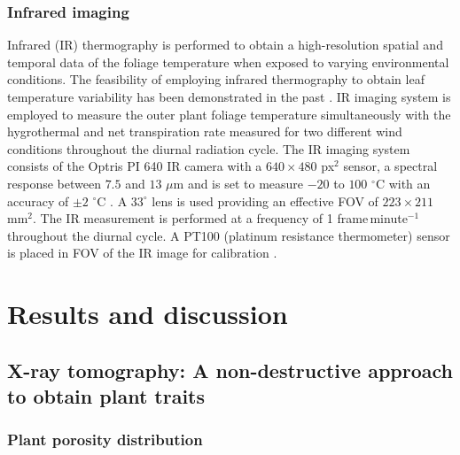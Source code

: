 \subsubsection*{Infrared imaging}
Infrared (IR) thermography is performed to obtain a high-resolution spatial and temporal data of the foliage temperature when exposed to varying environmental conditions. The feasibility of employing infrared thermography to obtain leaf temperature variability has been demonstrated in the past \citep{Jones1999,Merlot2002}. IR imaging system is employed to measure the outer plant foliage temperature simultaneously with the hygrothermal and net transpiration rate measured for two different wind conditions throughout the diurnal radiation cycle. The IR imaging system consists of the Optris PI 640 IR camera with a $640\times480$ px$^2$ sensor, a spectral response between $7.5$ and $13$ $\mu$m and is set to measure $-20$ to $100$ $^{\circ}$C  with an accuracy of $\pm2$ $^{\circ}$C  \citep{Allegrini2018,Tsalicoglou2018}. A $33^{\circ}$ lens is used providing an effective FOV of $223\times211$ mm$^2$. The IR measurement is performed at a frequency of 1 frame\,minute$^{-1}$ throughout the diurnal cycle. A PT100 (platinum resistance thermometer) sensor is placed in FOV of the IR image for calibration \citep{Allegrini2018}.


\section{Results and discussion}

\subsection{X-ray tomography: A non-destructive approach to obtain plant traits}
\label{subsec:xraytomo}

\subsubsection*{Plant porosity distribution} 


